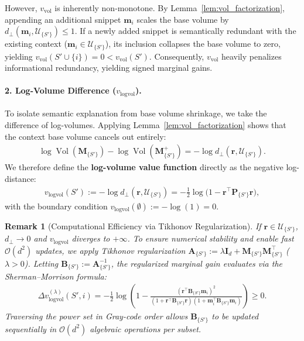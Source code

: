 \documentclass{article}
\newtheorem{remark}[theorem]{Remark}
\begin{document}
However, $v_{\text{vol}}$ is inherently non-monotone. By Lemma~\ref{lem:vol_factorization}, appending an additional snippet $\mathbf{m}_i$ scales the base volume by $d_{\perp}(\mathbf{m}_i, \mathcal{U}_{\{S'\}}) \le 1$. If a newly added snippet is semantically redundant with the existing context ($\mathbf{m}_i \in \mathcal{U}_{\{S'\}}$), its inclusion collapses the base volume to zero, yielding $v_{\text{vol}}(S' \cup \{i\}) = 0 < v_{\text{vol}}(S')$. Consequently, $v_{\text{vol}}$ heavily penalizes informational redundancy, yielding signed marginal gains.

\paragraph{2. Log-Volume Difference ($v_{\text{logvol}}$).}
To isolate semantic explanation from base volume shrinkage, we take the difference of log-volumes. Applying Lemma~\ref{lem:vol_factorization} shows that the context base volume cancels out entirely:
\begin{align}
    \log \operatorname{Vol}(\mathbf{M}_{\{S'\}}) - \log \operatorname{Vol}(\mathbf{M}^{+}_{\{S'\}}) = -\log d_{\perp}(\mathbf{r}, \mathcal{U}_{\{S'\}}).
\end{align}
We therefore define the \textbf{log-volume value function} directly as the negative log-distance:
\begin{align}\label{eq:v_logvol}
    v_{\text{logvol}}(S') := -\log d_{\perp}(\mathbf{r}, \mathcal{U}_{\{S'\}}) = -\frac{1}{2} \log\big(1 - \mathbf{r}^\top \mathbf{P}_{\{S'\}} \mathbf{r}\big),
\end{align}
with the boundary condition $v_{\text{logvol}}(\emptyset) := -\log(1) = 0$. 


\begin{remark}[Computational Efficiency via Tikhonov Regularization]
If $\mathbf{r} \in \mathcal{U}_{\{S'\}}$, $d_{\perp} \to 0$ and $v_{\text{logvol}}$ diverges to $+\infty$. To ensure numerical stability and enable fast $\mathcal{O}(d^2)$ updates, we apply Tikhonov regularization $\mathbf{A}_{\{S'\}} := \lambda \mathbf{I}_d + \mathbf{M}_{\{S'\}}\mathbf{M}_{\{S'\}}^\top$ ($\lambda > 0$). Letting $\mathbf{B}_{\{S'\}} := \mathbf{A}_{\{S'\}}^{-1}$, the regularized marginal gain evaluates via the Sherman--Morrison formula:
\begin{align}\label{eq:marginal_sherman}
    \Delta v_{\text{logvol}}^{(\lambda)}(S', i) = -\frac{1}{2} \log\left( 1 - \frac{(\mathbf{r}^\top \mathbf{B}_{\{S'\}} \mathbf{m}_i)^2}{(1 + \mathbf{r}^\top \mathbf{B}_{\{S'\}} \mathbf{r})(1 + \mathbf{m}_i^\top \mathbf{B}_{\{S'\}} \mathbf{m}_i)} \right) \ge 0.
\end{align}
Traversing the power set in Gray-code order allows $\mathbf{B}_{\{S'\}}$ to be updated sequentially in $\mathcal{O}(d^2)$ algebraic operations per subset.
\end{remark}
\end{document}
